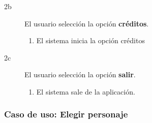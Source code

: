 \begin{description}
\begin{description}
            \item[2b ] El usuario selección la opción \textbf{créditos}.
            \begin{enumerate}
                \item El sistema inicia la opción créditos
            \end{enumerate}
            
            \item[2c ] El usuario selección la opción \textbf{salir}.
            \begin{enumerate}
                \item El sistema sale de la aplicación.
            \end{enumerate}
            
        \end{description}
\end{description}

\subsubsection{Caso de uso: Elegir personaje}

